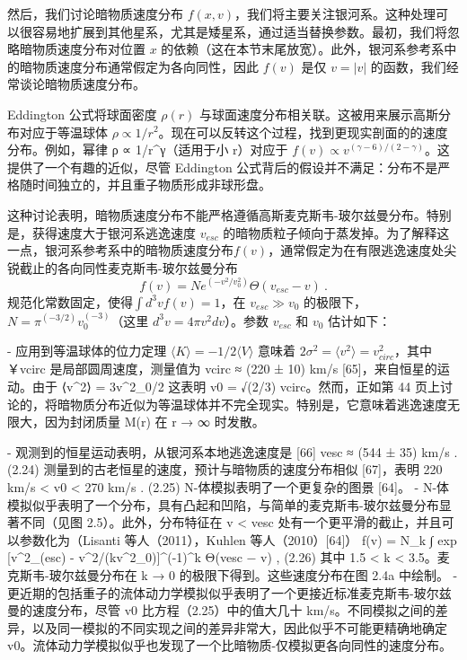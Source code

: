 

然后，我们讨论暗物质速度分布 $f(x, v)$，我们将主要关注银河系。这种处理可以很容易地扩展到其他星系，尤其是矮星系，通过适当替换参数。最初，我们将忽略暗物质速度分布对位置 $x$ 的依赖（这在本节末尾放宽）。此外，银河系参考系中的暗物质速度分布通常假定为各向同性，因此 $f(v)$ 是仅 $v = |v|$ 的函数，我们经常谈论暗物质速度分布。


Eddington 公式将球面密度 $\rho (r)$ 与球面速度分布相关联。这被用来展示高斯分布对应于等温球体 $\rho \propto 1/r^2$。现在可以反转这个过程，找到更现实剖面的的速度分布。例如，幂律 ρ ∝ 1/r^γ（适用于小 r）对应于 $f(v) \propto v^{(\gamma-6)/(2-\gamma)}$。这提供了一个有趣的近似，尽管 Eddington 公式背后的假设并不满足：分布不是严格随时间独立的，并且重子物质形成非球形盘。

这种讨论表明，暗物质速度分布不能严格遵循高斯麦克斯韦-玻尔兹曼分布。特别是，获得速度大于银河系逃逸速度 $v_{esc}$ 的暗物质粒子倾向于蒸发掉。为了解释这一点，银河系参考系中的暗物质速度分布$ f(v)$，通常假定为在有限逃逸速度处尖锐截止的各向同性麦克斯韦-玻尔兹曼分布
\begin{equation}
f(v) = N e^{(-v^2/v^2_0)} \Theta (v_{esc} - v)~.
\end{equation}
规范化常数固定，使得$ \int d^3v f(v) = 1$，在 $v_{esc} \gg v_0$ 的极限下，$N = \pi^{(-3/2)}v^{(-3)}_0$（这里 $d^3v = 4\pi v^2 dv$）。参数 $v_{esc}$ 和 $v_0$ 估计如下：

- 应用到等温球体的位力定理 $\langle K\rangle = -1/2\langle V \rangle$ 意味着 $2\sigma^2 = \langle v^2\rangle  = v^2_{circ}$，其中 ￥vcirc 是局部圆周速度，测量值为 vcirc ≈ (220 ± 10) km/s [65]，来自恒星的运动。由于 ⟨v^2⟩ = 3v^2_0/2 这表明 v0 = √(2/3) vcirc。然而，正如第 44 页上讨论的，将暗物质分布近似为等温球体并不完全现实。特别是，它意味着逃逸速度无限大，因为封闭质量 M(r) 在 r → ∞ 时发散。

- 观测到的恒星运动表明，从银河系本地逃逸速度是 [66]
vesc ≈ (544 ± 35) km/s . (2.24)
测量到的古老恒星的速度，预计与暗物质的速度分布相似 [67]，表明
220 km/s < v0 < 270 km/s . (2.25)
N-体模拟表明了一个更复杂的图景 [64]。
- N-体模拟似乎表明了一个分布，具有凸起和凹陷，与简单的麦克斯韦-玻尔兹曼分布显著不同（见图 2.5）。此外，分布特征在 v < vesc 处有一个更平滑的截止，并且可以参数化为（Lisanti 等人（2011），Kuhlen 等人（2010）[64]）
f(v) = N_k
∫ exp [v^2_(esc) - v^2/(kv^2_0)]^(-1)^k Θ(vesc − v) , (2.26)
其中 1.5 < k < 3.5。麦克斯韦-玻尔兹曼分布在 k → 0 的极限下得到。这些速度分布在图 2.4a 中绘制。
- 更近期的包括重子的流体动力学模拟似乎表明了一个更接近标准麦克斯韦-玻尔兹曼的速度分布，尽管 v0 比方程（2.25）中的值大几十 km/s。不同模拟之间的差异，以及同一模拟的不同实现之间的差异非常大，因此似乎不可能更精确地确定 v0。流体动力学模拟似乎也发现了一个比暗物质-仅模拟更各向同性的速度分布。

